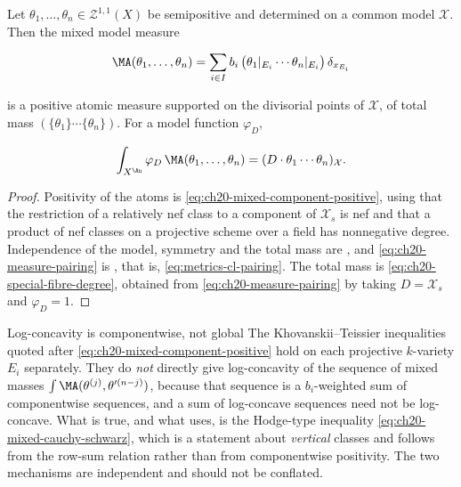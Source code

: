 \begin{proposition}
\label{prop:ch20-measure-positivity}
Let \(\theta_1,\ldots,\theta_n\in\mathcal Z^{1,1}(X)\) be semipositive and
determined on a common model \(\mathcal X\).  Then the mixed model measure

\begin{equation}
\label{eq:ch20-model-measure}
 \MA(\theta_1,\ldots,\theta_n)
 =\sum_{i\in I}b_i\,
   \bigl(\theta_{1}|_{E_i}\cdots\theta_{n}|_{E_i}\bigr)\,
   \delta_{x_{E_i}}
\end{equation}

is a positive atomic measure supported on the divisorial points of
\(\mathcal X\), of total mass \((\{\theta_1\}\cdots\{\theta_n\})\).  For a
model function \(\varphi_D\),

\begin{equation}
\label{eq:ch20-measure-pairing}
 \int_{X^{\An}}\varphi_D\,\MA(\theta_1,\ldots,\theta_n)
 =(D\cdot\theta_1\cdots\theta_n)_{\mathcal X}.
\end{equation}
\end{proposition}

\begin{proof}
Positivity of the atoms is \eqref{eq:ch20-mixed-component-positive}, using
that the restriction of a relatively nef class to a component of
\(\mathcal X_s\) is nef and that a product of nef classes on a projective
scheme over a field has nonnegative degree.  Independence of the model,
symmetry and the total mass are , and
\eqref{eq:ch20-measure-pairing} is
, that is,
\eqref{eq:metrics-cl-pairing}.  The total mass is
\eqref{eq:ch20-special-fibre-degree}, obtained from
\eqref{eq:ch20-measure-pairing} by taking \(D=\mathcal X_s\) and
\(\varphi_D=1\).
\end{proof}

\begin{warning}{Log-concavity is componentwise, not global}
The Khovanskii--Teissier inequalities quoted after
\eqref{eq:ch20-mixed-component-positive} hold on each projective
\(k\)-variety \(E_i\) separately.  They do \emph{not} directly give
log-concavity of the sequence of mixed masses
\(\int\MA(\theta^{(j)},\theta'^{(n-j)})\), because that sequence is a
\(b_i\)-weighted sum of componentwise sequences, and a sum of log-concave
sequences need not be log-concave.  What is true, and what
 uses, is the Hodge-type inequality
\eqref{eq:ch20-mixed-cauchy-schwarz}, which is a statement about
\emph{vertical} classes and follows from the row-sum relation rather than
from componentwise positivity.  The two mechanisms are independent and
should not be conflated.
\end{warning}

